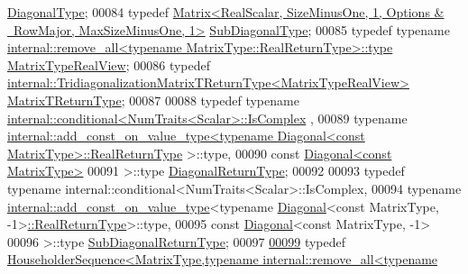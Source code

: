 \begin{DoxyCode}
       \hyperlink{class_eigen_1_1internal_1_1_tensor_lazy_evaluator_writable}{DiagonalType};
00084     \textcolor{keyword}{typedef} 
      \hyperlink{group___core___module_class_eigen_1_1_matrix}{Matrix<RealScalar, SizeMinusOne, 1, Options & ~RowMajor, MaxSizeMinusOne, 1>}
       \hyperlink{group___core___module_class_eigen_1_1_matrix}{SubDiagonalType};
00085     \textcolor{keyword}{typedef} \textcolor{keyword}{typename} 
      \hyperlink{group___sparse_core___module}{internal::remove\_all<typename MatrixType::RealReturnType>::type}
       \hyperlink{group___sparse_core___module}{MatrixTypeRealView};
00086     \textcolor{keyword}{typedef} \hyperlink{struct_eigen_1_1internal_1_1_tridiagonalization_matrix_t_return_type}{internal::TridiagonalizationMatrixTReturnType<MatrixTypeRealView>}
       \hyperlink{struct_eigen_1_1internal_1_1_tridiagonalization_matrix_t_return_type}{MatrixTReturnType};
00087 
00088     \textcolor{keyword}{typedef} \textcolor{keyword}{typename} \hyperlink{struct_eigen_1_1internal_1_1conditional}{internal::conditional<NumTraits<Scalar>::IsComplex}
      ,
00089               \textcolor{keyword}{typename} 
      \hyperlink{struct_eigen_1_1internal_1_1add__const__on__value__type}{internal::add\_const\_on\_value\_type<typename Diagonal<const MatrixType>::RealReturnType}
      >::type,
00090               \textcolor{keyword}{const} \hyperlink{group___core___module_class_eigen_1_1_diagonal}{Diagonal<const MatrixType>}
00091             >::type \hyperlink{class_eigen_1_1internal_1_1_tensor_lazy_evaluator_writable}{DiagonalReturnType};
00092 
00093     \textcolor{keyword}{typedef} \textcolor{keyword}{typename} internal::conditional<NumTraits<Scalar>::IsComplex,
00094               \textcolor{keyword}{typename} \hyperlink{struct_eigen_1_1internal_1_1add__const__on__value__type}{internal::add\_const\_on\_value\_type}<\textcolor{keyword}{typename} 
      \hyperlink{group___core___module_class_eigen_1_1_diagonal}{Diagonal}<\textcolor{keyword}{const} MatrixType, -1>\hyperlink{class_eigen_1_1internal_1_1_tensor_lazy_evaluator_writable}{::RealReturnType}>::type,
00095               \textcolor{keyword}{const} \hyperlink{group___core___module_class_eigen_1_1_diagonal}{Diagonal}<\textcolor{keyword}{const} MatrixType, -1>
00096             >::type \hyperlink{class_eigen_1_1internal_1_1_tensor_lazy_evaluator_writable}{SubDiagonalReturnType};
00097 
\hyperlink{group___eigenvalues___module_af322315c8bea9990152c9d09bfa2a69f}{00099}     \textcolor{keyword}{typedef} 
      \hyperlink{group___householder___module_class_eigen_1_1_householder_sequence}{HouseholderSequence<MatrixType,typename internal::remove\_all<typename
}
\end{DoxyCode}
